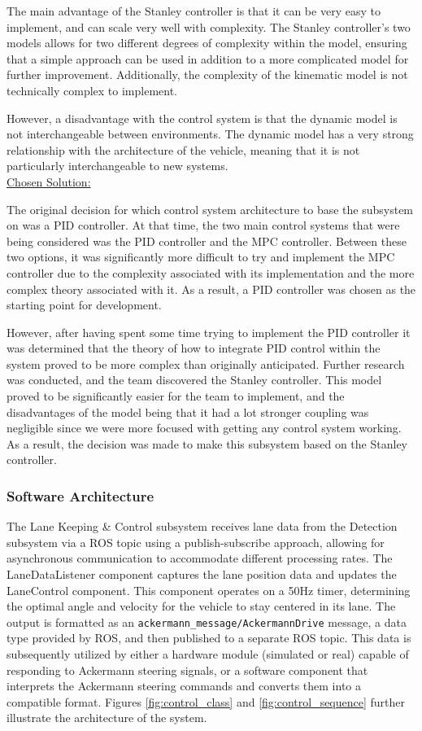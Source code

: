 \documentclass[titlepage,draft]{article}
\begin{document}
{The main advantage of the Stanley controller is that it can be very easy to implement, and can scale very well with complexity. The Stanley controller's two models allows for two different degrees of complexity within the model, ensuring that a simple approach can be used in addition to a more complicated model for further improvement. Additionally, the complexity of the kinematic model is not technically complex to implement.

However, a disadvantage with the control system is that the dynamic model is not interchangeable between environments. The dynamic model has a very strong relationship with the architecture of the vehicle, meaning that it is not particularly interchangeable to new systems.
\\

\underline{Chosen Solution:}

The original decision for which control system architecture to base the subsystem on was a PID controller. At that time, the two main control systems that were being considered was the PID controller and the MPC controller. Between these two options, it was significantly more difficult to try and implement the MPC controller due to the complexity associated with its implementation and the more complex theory associated with it. As a result, a PID controller was chosen as the starting point for development.

However, after having spent some time trying to implement the PID controller it was determined that the theory of how to integrate PID control within the system proved to be more complex than originally anticipated. Further research was conducted, and the team discovered the Stanley controller. This model proved to be significantly easier for the team to implement, and the disadvantages of the model being that it had a lot stronger coupling was negligible since we were more focused with getting any control system working. As a result, the decision was made to make this subsystem based on the Stanley controller.

\subsubsection{Software Architecture}

The Lane Keeping \& Control subsystem receives lane data from the Detection subsystem via a ROS topic using a publish-subscribe approach, allowing for asynchronous communication to accommodate different processing rates. The LaneDataListener component captures the lane position data and updates the LaneControl component. This component operates on a 50Hz timer, determining the optimal angle and velocity for the vehicle to stay centered in its lane. The output is formatted as an
\texttt{ackermann\_message/AckermannDrive} message,
a data type provided by ROS, and then published to a separate ROS topic. This data is subsequently utilized by either a hardware module (simulated or real) capable of responding to Ackermann steering signals, or a software component that interprets the Ackermann steering commands and converts them into a compatible format. Figures \ref{fig:control_class} and \ref{fig:control_sequence} further illustrate the architecture of the system.


}
\end{document}

